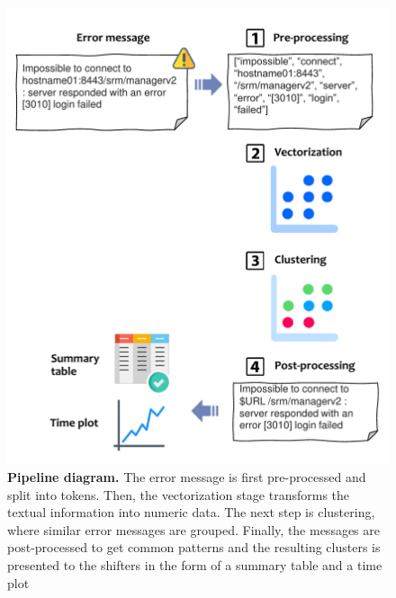 
\begin{figure}
    \centering
    \includegraphics[width=.8\textwidth]{figures/410_method/pipeline.pdf}
    \caption{\textbf{Pipeline diagram.}
    The error message is first pre-processed and split into tokens. Then, the vectorization stage transforms the textual information into numeric data.
    The next step is clustering, where similar error messages are grouped.
    Finally, the messages are post-processed to get common patterns and the resulting clusters is presented to the shifters in the form of a summary table and a time plot
    }
    \label{fig:pipeline_diagram}
\end{figure}




